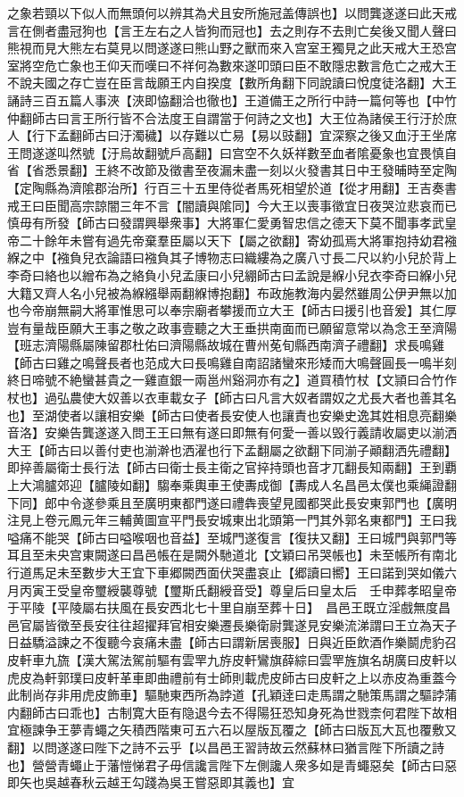 之象若頸以下似人而無頭何以辨其為犬且安所施冠盖傳誤也】以問龔遂遂曰此天戒言在側者盡冠狗也【言王左右之人皆狗而冠也】去之則存不去則亡矣後又聞人聲曰熊視而見大熊左右莫見以問遂遂曰熊山野之獸而來入宫室王獨見之此天戒大王恐宫室將空危亡象也王仰天而嘆曰不祥何為數來遂叩頭曰臣不敢隱忠數言危亡之戒大王不說夫國之存亡豈在臣言哉願王内自揆度【數所角翻下同說讀曰悅度徒洛翻】大王誦詩三百五篇人事浹【浹即恊翻洽也徹也】王道備王之所行中詩一篇何等也【中竹仲翻師古曰言王所行皆不合法度王自謂當于何詩之文也】大王位為諸侯王行汙於庶人【行下孟翻師古曰汙濁穢】以存難以亡易【易以豉翻】宜深察之後又血汙王坐席王問遂遂叫然號【汙烏故翻號戶高翻】曰宫空不久妖祥數至血者隂憂象也宜畏慎自省【省悉景翻】王終不改節及徵書至夜漏未盡一刻以火發書其日中王發晡時至定陶【定陶縣為濟隂郡治所】行百三十五里侍從者馬死相望於道【從才用翻】王吉奏書戒王曰臣聞高宗諒闇三年不言【闇讀與隂同】今大王以喪事徵宜日夜哭泣悲哀而已慎毋有所發【師古曰發謂興舉衆事】大將軍仁愛勇智忠信之德天下莫不聞事孝武皇帝二十餘年未嘗有過先帝棄羣臣屬以天下【屬之欲翻】寄幼孤焉大將軍抱持幼君襁緥之中【襁負兒衣論語曰襁負其子博物志曰織縷為之廣八寸長二尺以約小兒於背上李奇曰絡也以繒布為之絡負小兒孟康曰小兒綳師古曰孟說是緥小兒衣李奇曰緥小兒大籍又齊人名小兒被為緥繦舉兩翻緥博抱翻】布政施教海内晏然雖周公伊尹無以加也今帝崩無嗣大將軍惟思可以奉宗廟者攀援而立大王【師古曰援引也音爰】其仁厚豈有量哉臣願大王事之敬之政事壹聽之大王垂拱南面而已願留意常以為念王至濟陽【班志濟陽縣屬陳留郡杜佑曰濟陽縣故城在曹州莬旬縣西南濟子禮翻】求長鳴雞【師古曰雞之鳴聲長者也范成大曰長鳴雞自南詔諸蠻來形矮而大鳴聲圓長一鳴半刻終日啼號不絶蠻甚貴之一雞直銀一兩邕州谿洞亦有之】道買積竹杖【文頴曰合竹作杖也】過弘農使大奴善以衣車載女子【師古曰凡言大奴者謂奴之尤長大者也善其名也】至湖使者以讓相安樂【師古曰使者長安使人也讓責也安樂史逸其姓相息亮翻樂音洛】安樂告龔遂遂入問王王曰無有遂曰即無有何愛一善以毁行義請收屬吏以湔洒大王【師古曰以善付吏也湔澣也洒濯也行下孟翻屬之欲翻下同湔子顚翻洒先禮翻】即捽善屬衛士長行法【師古曰衛士長主衛之官捽持頭也音才兀翻長知兩翻】王到覇上大鴻臚郊迎【臚陵如翻】騶奉乘輿車王使夀成御【夀成人名昌邑太僕也乘䋲證翻下同】郎中令遂參乘且至廣明東都門遂曰禮犇喪望見國都哭此長安東郭門也【廣明注見上卷元鳳元年三輔黄圖宣平門長安城東出北頭第一門其外郭名東都門】王曰我嗌痛不能哭【師古曰嗌喉咽也音益】至城門遂復言【復扶又翻】王曰城門與郭門等耳且至未央宫東闕遂曰昌邑帳在是闕外馳道北【文穎曰吊哭帳也】未至帳所有南北行道馬足未至數步大王宜下車郷闕西面伏哭盡哀止【郷讀曰嚮】王曰諾到哭如儀六月丙寅王受皇帝璽綬襲尊號【璽斯氏翻綬音受】尊皇后曰皇太后　壬申葬孝昭皇帝于平陵【平陵屬右扶風在長安西北七十里自崩至葬十日】　昌邑王既立淫戲無度昌邑官屬皆徵至長安往往超擢拜官相安樂遷長樂衛尉龔遂見安樂流涕謂曰王立為天子日益驕溢諫之不復聽今哀痛未盡【師古曰謂新居喪服】日與近臣飲酒作樂鬬虎豹召皮軒車九旒【漢大駕法駕前驅有雲䍐九斿皮軒鸞旗薛綜曰雲䍐旌旗名胡廣曰皮軒以虎皮為軒郭璞曰皮軒革車即曲禮前有士師則載虎皮師古曰皮軒之上以赤皮為重蓋今此制尚存非用虎皮飾車】驅馳東西所為誖道【孔穎逹曰走馬謂之馳策馬謂之驅誖蒲内翻師古曰乖也】古制寛大臣有隐退今去不得陽狂恐知身死為世戮柰何君陛下故相宜極諫争王夢青蠅之矢積西階東可五六石以屋版瓦覆之【師古曰版瓦大瓦也覆敷又翻】以問遂遂曰陛下之詩不云乎【以昌邑王習詩故云然蘇林曰猶言陛下所讀之詩也】營營青蠅止于藩愷悌君子毋信讒言陛下左側讒人衆多如是青蠅惡矣【師古曰惡即矢也吳越春秋云越王勾踐為吳王嘗惡即其義也】宜
